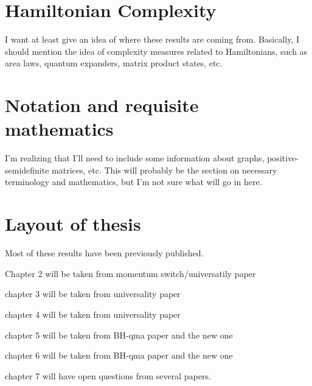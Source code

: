 
\section{Hamiltonian Complexity}

I want at least give an idea of where these results are coming from.  Basically, I should mention the idea of complexity measures related to Hamiltonians, such as area laws, quantum expanders, matrix product states, etc.


\section{Notation and requisite mathematics}

I'm realizing that I'll need to include some information about graphs, positive-semidefinite matrices, etc.  This will probably be the section on necessary terminology and mathematics, but I'm not sure what will go in here.


\section{Layout of thesis}

Most of these results have been previously published.

Chapter 2 will be taken from momentum switch/universatily paper

chapter 3 will be taken from universality paper

chapter 4 will be taken from universality paper

chapter 5 will be taken from BH-qma paper and the new one

chapter 6 will be taken from BH-qma paper and the new one

chapter 7 will have open questions from several papers.
